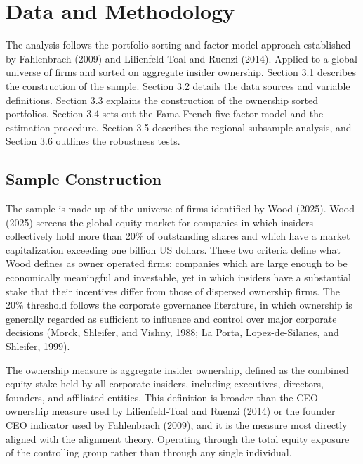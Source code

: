 
\section{Data and Methodology}

The analysis follows the portfolio sorting and factor model approach established by Fahlenbrach (2009) and Lilienfeld-Toal and Ruenzi (2014). Applied to a global universe of firms and sorted on aggregate insider ownership. Section 3.1 describes the construction of the sample. Section 3.2 details the data sources and variable definitions. Section 3.3 explains the construction of the ownership sorted portfolios. Section 3.4 sets out the Fama-French five factor model and the estimation procedure. Section 3.5 describes the regional subsample analysis, and Section 3.6 outlines the robustness tests.


\subsection{Sample Construction}

The sample is made up of the universe of firms identified by Wood (2025). Wood (2025) screens the global equity market for companies in which insiders collectively hold more than 20\% of outstanding shares and which have a market capitalization exceeding one billion US dollars. These two criteria define what Wood defines as owner operated firms: companies which are large enough to be economically meaningful and investable, yet in which insiders have a substantial stake that their incentives differ from those of dispersed ownership firms. The 20\% threshold follows the corporate governance literature, in which ownership is generally regarded as sufficient to influence and control over major corporate decisions (Morck, Shleifer, and Vishny, 1988; La Porta, Lopez-de-Silanes, and Shleifer, 1999).

The ownership measure is aggregate insider ownership, defined as the combined equity stake held by all corporate insiders, including executives, directors, founders, and affiliated entities. This definition is broader than the CEO ownership measure used by Lilienfeld-Toal and Ruenzi (2014) or the founder CEO indicator used by Fahlenbrach (2009), and it is the measure most directly aligned with the alignment theory. Operating through the total equity exposure of the controlling group rather than through any single individual.


